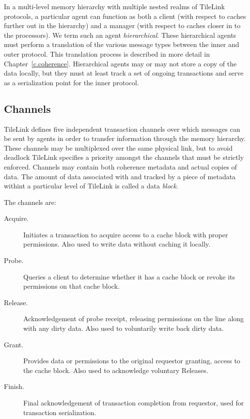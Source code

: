 In a multi-level memory hierarchy with multiple nested realms of TileLink protocols, a particular agent can function as both
a client (with respect to caches further out in the hierarchy)
and a manager (with respect to caches closer in to the processors).
We term such an agent {\em hierarchical}.
These hierarchical agents must perform a translation of the various message types between the inner and outer protocol.
This translation process is described in more detail in Chapter~\ref{c.coherence}.
Hierarchical agents may or may not store a copy of the data locally, but they must at least track a set of ongoing transactions and serve as a serialization point for the inner protocol.

\subsection{Channels}

TileLink defines five independent transaction channels over which messages can be sent by agents in order to transfer information through the memory hierarchy.
These channels may be multiplexed over the same physical link, but to avoid deadlock TileLink specifies a priority amongst the channels that must be strictly enforced.
Channels may contain both coherence metadata and actual copies of data.
The amount of data associated with and tracked by a piece of metadata withint a particular level of TileLink is called a data {\em block}.

The channels are:
\begin{description}
\item[Acquire.] Initiates a transaction to acquire access to a cache block with proper permissions. Also used to write data without caching it locally.
\item[Probe.] Queries a client to determine whether it has a cache block or revoke its permissions on that cache block.
\item[Release.] Acknowledgement of probe receipt, releasing permissions on the line along with any dirty data. Also used to voluntarily write back dirty data.
\item[Grant.] Provides data or permissions to the original requestor granting, access to the cache block. Also used to acknowledge voluntary Releases.
\item[Finish.] Final acknowledgement of transaction completion from requestor, used for transaction serialization.
\end{description}

